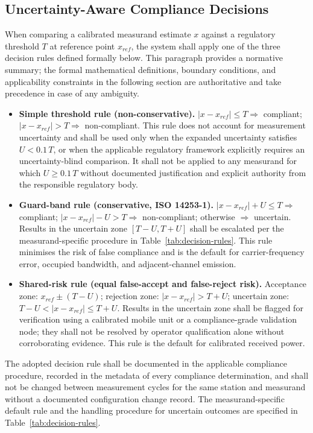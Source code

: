 \documentclass[11pt]{article}
\begin{document}
\subsection*{Uncertainty-Aware Compliance Decisions}

When comparing a calibrated measurand estimate $x$ against a regulatory threshold $T$ at reference point $x_{ref}$, the system shall apply one of the three decision rules defined formally below. This paragraph provides a normative summary; the formal mathematical definitions, boundary conditions, and applicability constraints in the following section are authoritative and take precedence in case of any ambiguity.

\begin{itemize}
    \item \textbf{Simple threshold rule (non-conservative).} $|x - x_{ref}| \leq T \Rightarrow$ compliant; $|x - x_{ref}| > T \Rightarrow$ non-compliant. This rule does not account for measurement uncertainty and shall be used only when the expanded uncertainty satisfies $U < 0.1\,T$, or when the applicable regulatory framework explicitly requires an uncertainty-blind comparison. It shall not be applied to any measurand for which $U \geq 0.1\,T$ without documented justification and explicit authority from the responsible regulatory body.
    \item \textbf{Guard-band rule (conservative, ISO 14253-1).} $|x - x_{ref}| + U \leq T \Rightarrow$ compliant; $|x - x_{ref}| - U > T \Rightarrow$ non-compliant; otherwise $\Rightarrow$ uncertain. Results in the uncertain zone $[T-U, T+U]$ shall be escalated per the measurand-specific procedure in Table~\ref{tab:decision-rules}. This rule minimises the risk of false compliance and is the default for carrier-frequency error, occupied bandwidth, and adjacent-channel emission.
    \item \textbf{Shared-risk rule (equal false-accept and false-reject risk).} Acceptance zone: $x_{ref} \pm (T - U)$; rejection zone: $|x - x_{ref}| > T + U$; uncertain zone: $T - U < |x - x_{ref}| \leq T + U$. Results in the uncertain zone shall be flagged for verification using a calibrated mobile unit or a compliance-grade validation node; they shall not be resolved by operator qualification alone without corroborating evidence. This rule is the default for calibrated received power.
\end{itemize}

The adopted decision rule shall be documented in the applicable compliance procedure, recorded in the metadata of every compliance determination, and shall not be changed between measurement cycles for the same station and measurand without a documented configuration change record. The measurand-specific default rule and the handling procedure for uncertain outcomes are specified in Table~\ref{tab:decision-rules}.
\end{document}
